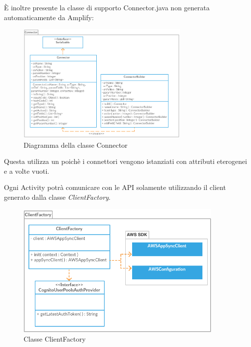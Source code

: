 È inoltre presente la classe di supporto Connector.java non generata automaticamente da Amplify:
        \begin{figure}[H]
	    \begin{center}
		\includegraphics[width=0.75\textwidth, keepaspectratio]{../includes/pics/connector.png}
		\caption{Diagramma della classe Connector}
	    \end{center}
        \end{figure}
        
Questa utilizza un  poichè i connettori vengono istanziati con attributi eterogenei e a volte vuoti.        

Ogni Activity potrà comunicare con le API solamente utilizzando il client generato dalla classe \emph{ClientFactory}.\\[0.25cm]

\begin{figure}[H]
	\begin{center}
		\includegraphics[width=0.9\textwidth, keepaspectratio]{../includes/pics/clientfactory.png}
		\caption{Classe ClientFactory}
	\end{center}
\end{figure}


